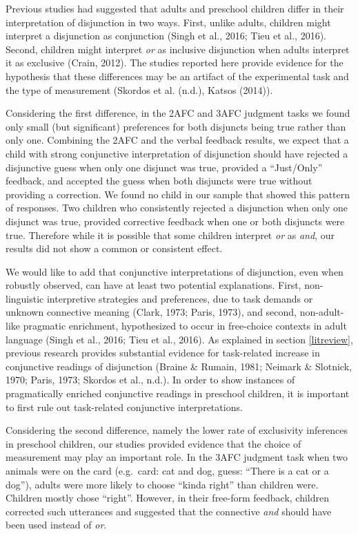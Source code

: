 \documentclass[,man,floatsintext]{apa6}
\begin{document}
Previous studies had suggested that adults and preschool children differ in their interpretation of disjunction in two ways. First, unlike adults, children might interpret a disjunction as conjunction (Singh et al., 2016; Tieu et al., 2016). Second, children might interpret \emph{or} as inclusive disjunction when adults interpret it as exclusive (Crain, 2012). The studies reported here provide evidence for the hypothesis that these differences may be an artifact of the experimental task and the type of measurement (Skordos et al. (n.d.), Katsos (2014)).

Considering the first difference, in the 2AFC and 3AFC judgment tasks we found only small (but significant) preferences for both disjuncts being true rather than only one. Combining the 2AFC and the verbal feedback results, we expect that a child with strong conjunctive interpretation of disjunction should have rejected a disjunctive guess when only one disjunct was true, provided a \enquote{Just/Only} feedback, and accepted the guess when both disjuncts were true without providing a correction. We found no child in our sample that showed this pattern of responses. Two children who consistently rejected a disjunction when only one disjunct was true, provided corrective feedback when one or both disjuncts were true. Therefore while it is possible that some children interpret \emph{or} as \emph{and}, our results did not show a common or consistent effect.

We would like to add that conjunctive interpretations of disjunction, even when robustly observed, can have at least two potential explanations. First, non-linguistic interpretive strategies and preferences, due to task demands or unknown connective meaning (Clark, 1973; Paris, 1973), and second, non-adult-like pragmatic enrichment, hypothesized to occur in free-choice contexts in adult language (Singh et al., 2016; Tieu et al., 2016). As explained in section \ref{litreview}, previous research provides substantial evidence for task-related increase in conjunctive readings of disjunction (Braine \& Rumain, 1981; Neimark \& Slotnick, 1970; Paris, 1973; Skordos et al., n.d.). In order to show instances of pragmatically enriched conjunctive readings in preschool children, it is important to first rule out task-related conjunctive interpretations.

Considering the second difference, namely the lower rate of exclusivity inferences in preschool children, our studies provided evidence that the choice of measurement may play an important role. In the 3AFC judgment task when two animals were on the card (e.g.~card: cat and dog, guess: \enquote{There is a cat or a dog}), adults were more likely to choose \enquote{kinda right} than children were. Children mostly chose \enquote{right}. However, in their free-form feedback, children corrected such utterances and suggested that the connective \emph{and} should have been used instead of \emph{or}.
\end{document}

